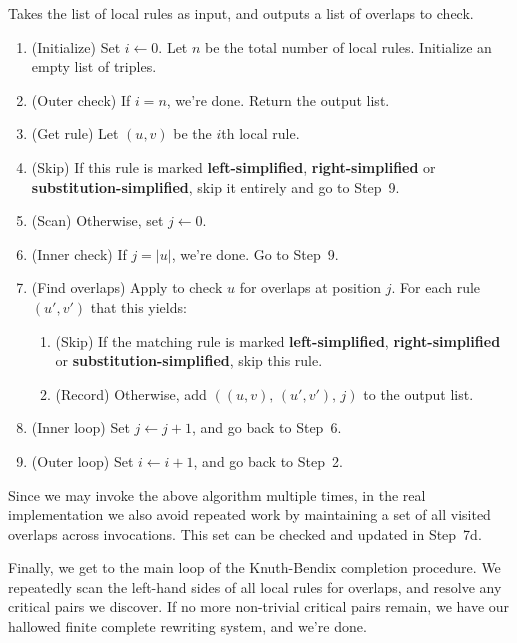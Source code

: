 \documentclass[../generics]{subfiles}
\begin{document}
\begin{algorithm}\label{find overlapping rule algo}
Takes the list of local rules as input, and outputs a list of overlaps to check. 
\begin{enumerate}
\item (Initialize) Set $i \leftarrow 0$. Let $n$ be the total number of local rules. Initialize an empty list of triples.
\item (Outer check) If $i=n$, we're done. Return the output list.
\item (Get rule) Let $(u,v)$ be the $i$th local rule.
\item (Skip) If this rule is marked \textbf{left-simplified}, \textbf{right-simplified} or \textbf{substitution-simplified}, skip it entirely and go to Step~9.
\item (Scan) Otherwise, set $j \leftarrow 0$.
\item (Inner check) If $j=|u|$, we're done. Go to Step~9.
\item (Find overlaps) Apply  to check $u$ for overlaps at position $j$. For each rule $(u', v')$ that this yields:
\begin{enumerate}
\item (Skip) If the matching rule is marked \textbf{left-simplified}, \textbf{right-simplified} or \textbf{substitution-simplified}, skip this rule.
\item (Record) Otherwise, add $((u, v),\,(u', v'),\,j)$ to the output list.
\end{enumerate}
\item (Inner loop) Set $j\leftarrow j+1$, and go back to Step~6.
\item (Outer loop) Set $i\leftarrow i+1$, and go back to Step~2.
\end{enumerate}
\end{algorithm}

Since we may invoke the above algorithm multiple times, in the real implementation we also avoid repeated work by maintaining a set of all visited overlaps across invocations. This set can be checked and updated in Step~7d.

Finally, we get to the main loop of the Knuth-Bendix completion procedure. We repeatedly scan the left-hand sides of all local rules for overlaps, and resolve any critical pairs we discover. If no more non-trivial critical pairs remain, we have our hallowed finite complete rewriting system, and we're done.
\end{document}
